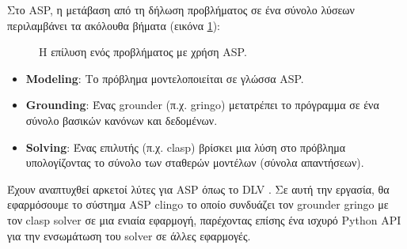 \documentclass[10pt,leqno]{amsart}
\begin{document}
Στο ASP, η μετάβαση από τη δήλωση προβλήματος σε ένα σύνολο λύσεων περιλαμβάνει τα ακόλουθα βήματα \cite{Gebser2013}
(εικόνα \ref{fig:asp-solving}):

\begin{figure}[htb]
    \begin{center}
    \end{center}
    \caption{Η επίλυση ενός προβλήματος με χρήση ASP.}
    \label{fig:asp-solving}
\end{figure}



\begin{itemize}
    \item \textbf{Modeling}: Το πρόβλημα μοντελοποιείται σε γλώσσα ASP.
    \item \textbf{Grounding}: Ένας grounder (π.χ. gringo) μετατρέπει το πρόγραμμα σε ένα σύνολο βασικών κανόνων και δεδομένων.
    \item \textbf{Solving}: Ένας επιλυτής (π.χ. clasp) βρίσκει μια λύση στο πρόβλημα υπολογίζοντας το σύνολο των σταθερών μοντέλων (σύνολα απαντήσεων).
\end{itemize}


Έχουν αναπτυχθεί αρκετοί λύτες για ASP όπως το DLV \cite{Xia2020}. Σε αυτή την εργασία, θα εφαρμόσουμε το σύστημα ASP clingo \cite{Gebser2014} το οποίο συνδυάζει τον grounder gringo με τον clasp solver\cite{Holldobler2014} σε μια ενιαία εφαρμογή, παρέχοντας επίσης ένα ισχυρό Python API για την ενσωμάτωση του solver σε άλλες εφαρμογές.
\end{document}
